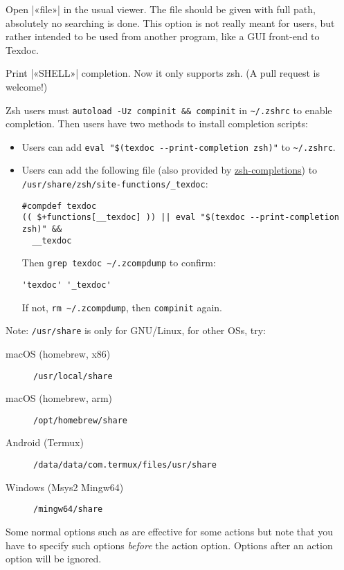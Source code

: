 \documentclass{texdoc-doc}
\begin{document}
\begin{clopt}{}
Open |«file»| in the usual viewer. The file should be given with full path,
absolutely no searching is done. This option is not really meant for users,
but rather intended to be used from another program, like a GUI front-end to
Texdoc.
\end{clopt}

\begin{clopt}{}
Print |«SHELL»| completion. Now it only supports zsh. (A pull request is welcome!)

Zsh users must \verb|autoload -Uz compinit && compinit| in \verb|~/.zshrc| to enable completion. Then users have two methods to install completion scripts:

\begin{itemize}
  \item Users can add \verb|eval "$(texdoc --print-completion zsh)"| to \verb|~/.zshrc|.
  \item Users can add the following file (also provided by \href{https://github.com/zsh-users/zsh-completions}{zsh-completions}) to \\\verb|/usr/share/zsh/site-functions/_texdoc|:
\begin{verbatim}
#compdef texdoc
(( $+functions[__texdoc] )) || eval "$(texdoc --print-completion zsh)" &&
  __texdoc
\end{verbatim}
    Then \verb|grep texdoc ~/.zcompdump| to confirm:
\begin{verbatim}
'texdoc' '_texdoc'
\end{verbatim}
If not, \verb|rm ~/.zcompdump|, then \verb|compinit| again.
\end{itemize}
\end{clopt}

Note: \verb|/usr/share| is only for GNU/Linux, for other OSs, try:
\begin{description}
  \item[macOS (homebrew, x86)]\verb|/usr/local/share|
  \item[macOS (homebrew, arm)]\verb|/opt/homebrew/share|
  \item[Android (Termux)]\verb|/data/data/com.termux/files/usr/share|
  \item[Windows (Msys2 Mingw64)]\verb|/mingw64/share|
\end{description}

Some normal options such as  are effective for some actions but note
that you have to specify such options \emph{before} the action option. Options
after an action option will be ignored.
\end{document}
